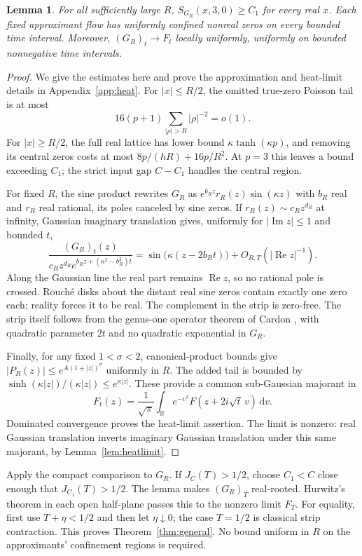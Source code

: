 \documentclass[11pt]{article}
\newtheorem{lemma}[theorem]{Lemma}
\theoremstyle{remark}\newtheorem{remark}[theorem]{Remark}
\newcommand{\Rea}{\operatorname{Re}}
\newcommand{\Ima}{\operatorname{Im}}
\newcommand{\dd}{\mathrm{d}}
\begin{document}
\begin{lemma}\label{lem:approx}
For all sufficiently large $R$, $S_{G_R}(x,3,0)\ge C_1$ for every real
$x$. Each fixed approximant flow has uniformly confined nonreal zeros
on every bounded time interval. Moreover, $(G_R)_t\to F_t$ locally
uniformly, uniformly on bounded nonnegative time intervals.
\end{lemma}
\begin{proof}
We give the estimates here and prove the approximation and heat-limit
details in Appendix~\ref{app:heat}.
For $|x|\le R/2$, the omitted true-zero Poisson tail is at most
\[16(p+1)\sum_{|\rho|>R}|\rho|^{-2}=o(1).\]
For $|x|\ge R/2$, the full real lattice has lower bound
$\kappa\tanh(\kappa p)$, and removing its central zeros costs at most
$8p/(hR)+16p/R^2$. At $p=3$ this leaves a bound exceeding $C_1$;
the strict input gap $C-C_1$ handles the central region.

For fixed $R$, the sine product rewrites $G_R$ as
$e^{b_Rz}r_R(z)\sin(\kappa z)$ with $b_R$ real and $r_R$ real rational,
its poles canceled by sine zeros. If $r_R(z)\sim c_Rz^{d_R}$ at infinity,
Gaussian imaginary translation gives, uniformly for $|\Ima z|\le1$
and bounded $t$,
\begin{equation}
 \frac{(G_R)_t(z)}{c_Rz^{d_R}e^{b_Rz+(\kappa^2-b_R^2)t}}
 =\sin\bigl(\kappa(z-2b_Rt)\bigr)+O_{R,T}(|\Rea z|^{-1}).
 \label{eq:sine}
\end{equation}
Along the Gaussian line the real part remains $\Rea z$, so no rational
pole is crossed. Rouch\'e disks about the distant real sine zeros contain
exactly one zero each; reality forces it to be real. The complement in
the strip is zero-free. The strip itself follows from the genus-one
operator theorem of Cardon \cite[Theorem~1.5]{cardon}, with quadratic
parameter $2t$ and no quadratic exponential in $G_R$.

Finally, for any fixed $1<\sigma<2$, canonical-product bounds give
$|P_R(z)|\le e^{A(1+|z|)^\sigma}$ uniformly in $R$. The added tail is
bounded by $\sinh(\kappa|z|)/(\kappa|z|)\le e^{\kappa|z|}$.
These provide a common sub-Gaussian majorant in
\[ F_t(z)=\frac1{\sqrt\pi}\int_{\mathbb R}e^{-v^2}
                   F(z+2i\sqrt t\,v)\,\dd v. \]
Dominated convergence proves the heat-limit assertion. The limit is
nonzero: real Gaussian translation inverts imaginary Gaussian translation
under this same majorant, by Lemma~\ref{lem:heatlimit}.
\end{proof}

Apply the compact comparison to $G_R$. If $J_C(T)>1/2$, choose $C_1<C$
close enough that $J_{C_1}(T)>1/2$. The lemma makes $(G_R)_T$ real-rooted.
Hurwitz's theorem in each open half-plane passes this to the nonzero
limit $F_T$. For equality, first use $T+\eta<1/2$ and then let
$\eta\downarrow0$; the case $T=1/2$ is classical strip contraction.
This proves Theorem~\ref{thm:general}. No bound uniform in $R$ on the
approximants' confinement regions is required.
\end{document}
